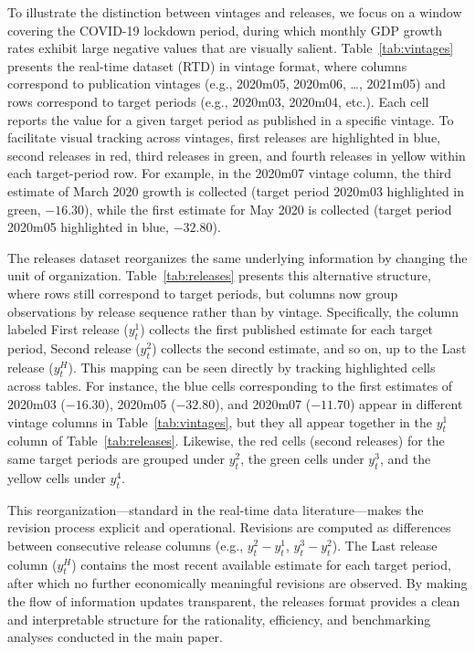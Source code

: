\documentclass[a4paper, fleqn, 11pt]{article}
\begin{document}
To illustrate the distinction between vintages and releases, we focus on a window covering the COVID-19 lockdown period, during which monthly GDP growth rates exhibit large negative values that are visually salient. Table~\ref{tab:vintages} presents the real-time dataset (RTD) in vintage format, where columns correspond to publication vintages (e.g., 2020m05, 2020m06, \ldots, 2021m05) and rows correspond to target periods (e.g., 2020m03, 2020m04, etc.). Each cell reports the value for a given target period as published in a specific vintage. To facilitate visual tracking across vintages, first releases are highlighted in blue, second releases in red, third releases in green, and fourth releases in yellow within each target-period row. For example, in the 2020m07 vintage column, the third estimate of March 2020 growth is collected (target period 2020m03 highlighted in green, $-16.30$), while the first estimate for May 2020 is collected (target period 2020m05 highlighted in blue, $-32.80$).

The releases dataset reorganizes the same underlying information by changing the unit of organization. Table~\ref{tab:releases} presents this alternative structure, where rows still correspond to target periods, but columns now group observations by release sequence rather than by vintage. Specifically, the column labeled First release ($y_t^1$) collects the first published estimate for each target period, Second release ($y_t^2$) collects the second estimate, and so on, up to the Last release ($y_t^H$). This mapping can be seen directly by tracking highlighted cells across tables. For instance, the blue cells corresponding to the first estimates of 2020m03 ($-16.30$), 2020m05 ($-32.80$), and 2020m07 ($-11.70$) appear in different vintage columns in Table~\ref{tab:vintages}, but they all appear together in the $y_t^1$ column of Table~\ref{tab:releases}. Likewise, the red cells (second releases) for the same target periods are grouped under $y_t^2$, the green cells under $y_t^3$, and the yellow cells under $y_t^4$.

This reorganization---standard in the real-time data literature---makes the revision process explicit and operational. Revisions are computed as differences between consecutive release columns (e.g., $y_t^2 - y_t^1$, $y_t^3 - y_t^2$). The Last release column ($y_t^H$) contains the most recent available estimate for each target period, after which no further economically meaningful revisions are observed. By making the flow of information updates transparent, the releases format provides a clean and interpretable structure for the rationality, efficiency, and benchmarking analyses conducted in the main paper.
\end{document}

